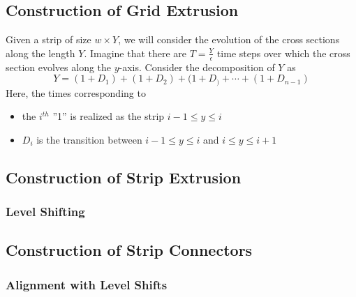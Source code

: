 \subsection{Construction of Grid Extrusion}
\label{sec:construction_of_grid_extrusion}
Given a strip of size $w\times Y$, we will consider the evolution of the cross sections along the length $Y$.
Imagine that there are $T = \frac Y\epsilon$ time steps over which the cross section evolves along the $y$-axis.
Consider the decomposition of $Y$ as
$$Y = (1 + D_1) + (1 + D_2) + (1 + D_) +\cdots + (1 + D_{n-1})$$
Here, the times corresponding to
\begin{itemize}
	\item the $i^{th}$ ''1'' is realized as the strip $i-1\le y\le i$
	\item $D_i$ is the transition between $i-1\le y\le i$ and $i\le y\le i+1$
\end{itemize}

\subsection{Construction of Strip Extrusion}
\label{sec:construction_of_strip_extrusion}

\subsubsection{Level Shifting}
\label{sec:level_shifting}



\subsection{Construction of Strip Connectors}
\label{sec:construction_of_strip_connectors}

\subsubsection{Alignment with Level Shifts}
\label{sec:alignment_with_level_shifts}


